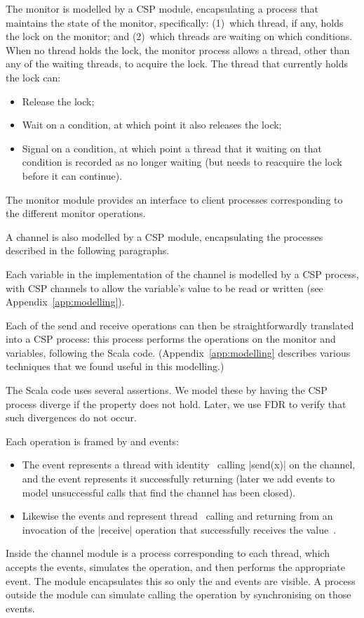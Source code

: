 The monitor is modelled by a CSP module, encapsulating a process that
maintains the state of the monitor, specifically: (1)~which thread, if any,
holds the lock on the monitor; and (2)~which threads are waiting on which
conditions.  When no thread holds the lock, the monitor process allows a
thread, other than any of the waiting threads, to acquire the lock.  The
thread that currently holds the lock can:
\begin{itemize}
\item Release the lock;
\item Wait on a condition, at which point it also releases the lock;
\item Signal on a condition, at which point a thread that it waiting on that
  condition is recorded as no longer waiting (but needs to reacquire the lock
  before it can continue).
\end{itemize}
%
The monitor module provides an interface to client processes corresponding to
the different monitor operations.

A channel is also modelled by a CSP module, encapsulating the processes
described in the following paragraphs.   

Each variable in the implementation of the channel is modelled by a CSP
process, with CSP channels to allow the variable's value to be read or
written (see Appendix~\ref{app:modelling}).

Each of the send and receive operations can then be straightforwardly
translated into a CSP process: this process performs the operations on the
monitor and variables, following the Scala code.
(Appendix~\ref{app:modelling} describes various techniques that we found
useful in this modelling.)

The Scala code uses several assertions.  We model these by having the CSP
process diverge if the property does not hold.  Later, we use FDR to verify
that such divergences do not occur.  

Each operation is framed by  and  events:
%
\begin{itemize}
\item The event  represents a thread with
  identity~ calling |send(x)| on the channel, and the event
   represents it successfully returning (later we
  add events to model unsuccessful calls that find the channel has
  been closed).

\item Likewise the events  and
   represent thread~ calling and
  returning from an invocation of the |receive| operation that successfully
  receives the value~.
\end{itemize}
%
Inside the channel module is a process corresponding to each thread, which
accepts the  events, simulates the operation, and then performs
the appropriate  event.  The module encapsulates this so only the
 and  events are visible.  A process outside the module
can simulate calling the operation by synchronising on those events.

